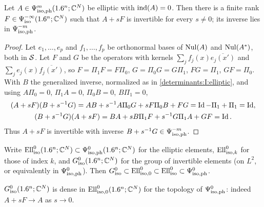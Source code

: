\begin{proposition}\label{determinants:prop:invertible-perturbation}
  Let $A\in\Psi^{m}_{\mathrm{iso,ph}}(1.6^n;\mathbb{C}^N)$ be elliptic with $\operatorname{ind}(A)=0$. Then there is
  a finite rank $F\in\Psi^{-\infty}_{\mathrm{iso}}(1.6^n;\mathbb{C}^N)$ such that $A+sF$ is
  invertible for every $s\ne0$; its inverse lies in $\Psi^{-m}_{\mathrm{iso,ph}}$.
\end{proposition}
\begin{proof}
  Let $e_1,\dots,e_p$ and $f_1,\dots,f_p$ be orthonormal bases of $\operatorname{Nul}(A)$ and
  $\operatorname{Nul}(A^*)$, both in $\mathcal{S}$. Let $F$ and $G$ be the operators with kernels
  $\sum_jf_j(x)\overline{e_j(x')}$ and $\sum_je_j(x)\overline{f_j(x')}$, so
  $F=\Pi_1F=F\Pi_0$, $G=\Pi_0G=G\Pi_1$, $FG=\Pi_1$, $GF=\Pi_0$. With $B$ the
  generalized inverse, normalized as in \ref{determinants:I:elliptic}, and
  using $A\Pi_0=0$, $\Pi_1A=0$, $\Pi_0B=0$, $B\Pi_1=0$,
  \begin{gather*}
    (A+sF)(B+s^{-1}G)=AB+s^{-1}A\Pi_0G+sF\Pi_0B+FG=\operatorname{Id}-\Pi_1+\Pi_1=\operatorname{Id},\\
    (B+s^{-1}G)(A+sF)=BA+sB\Pi_1F+s^{-1}G\Pi_1A+GF=\operatorname{Id} .
  \end{gather*}
  Thus $A+sF$ is invertible with inverse $B+s^{-1}G\in\Psi^{-m}_{\mathrm{iso,ph}}$.
\end{proof}

Write $\operatorname{Ell}^0_{\mathrm{iso}}(1.6^n;\mathbb{C}^N)\subset\Psi^{0}_{\mathrm{iso,ph}}(1.6^n;\mathbb{C}^N)$ for the
elliptic elements, $\operatorname{Ell}^0_{\mathrm{iso},k}$ for those of index $k$, and
$G^{0}_{\mathrm{iso}}(1.6^n;\mathbb{C}^N)$ for the group of invertible elements (on $L^2$, or
equivalently in $\Psi^{0}_{\mathrm{iso,ph}}$). Then
$G^{0}_{\mathrm{iso}}\subset\operatorname{Ell}^0_{\mathrm{iso},0}\subset\operatorname{Ell}^0_{\mathrm{iso}}\subset\Psi^{0}_{\mathrm{iso,ph}}$.

\begin{corollary}\label{determinants:cor:dense}
  $G^{0}_{\mathrm{iso}}(1.6^n;\mathbb{C}^N)$ is dense in $\operatorname{Ell}^0_{\mathrm{iso},0}(1.6^n;\mathbb{C}^N)$ for
  the topology of $\Psi^{0}_{\mathrm{iso,ph}}$: indeed $A+sF\to A$ as $s\to0$.
\end{corollary}


